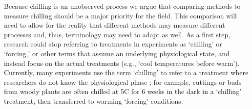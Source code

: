 \documentclass[11pt]{article}
\begin{document}
Because chilling is an unobserved process we argue that comparing methods to measure chilling should be a major priority for the field. This comparison will need to allow for the reality that different methods may measure different processes and, thus, terminology may need to adapt as well. As a first step, research could stop referring to treatments in experiments as `chilling' or `forcing,' or other terms that assume an underlying physiological state, and instead focus on the actual treatments (e.g., `cool temperatures before warm'). Currently, many experiments use the term `chilling' to refer to a treatment where researchers do not know the physiological phase \citep{flynn2018,ospreebbms}; for example, cuttings or buds from woody plants are often chilled at 5\degree C for 6 weeks in the dark in a `chilling' treatment, then transferred to warming `forcing' conditions. %

\end{document}
